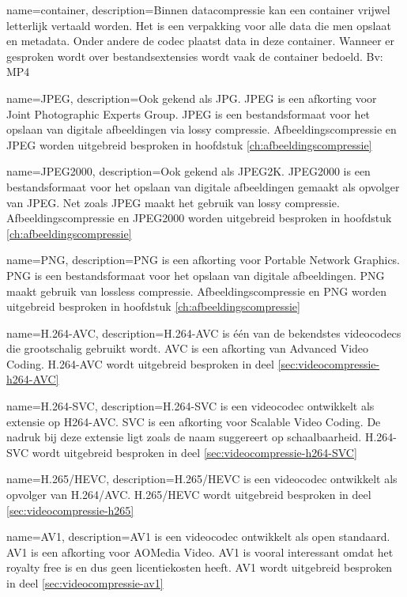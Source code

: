 {
	name={container},
	description={Binnen datacompressie kan een container vrijwel letterlijk vertaald worden. Het is een verpakking voor alle data die men opslaat en metadata. Onder andere de codec plaatst data in deze container. Wanneer er gesproken wordt over bestandsextensies wordt vaak de container bedoeld. Bv: MP4}
}

{
	name={JPEG},
	description={Ook gekend als JPG. JPEG is een afkorting voor Joint Photographic Experts Group. JPEG is een bestandsformaat voor het opslaan van digitale afbeeldingen via lossy compressie. Afbeeldingscompressie en JPEG worden uitgebreid besproken in hoofdstuk \ref{ch:afbeeldingscompressie}}
}

{
	name={JPEG2000},
	description={Ook gekend als JPEG2K. JPEG2000 is een bestandsformaat voor het opslaan van digitale afbeeldingen gemaakt als opvolger van JPEG. Net zoals JPEG maakt het gebruik van lossy compressie. Afbeeldingscompressie en JPEG2000 worden uitgebreid besproken in hoofdstuk \ref{ch:afbeeldingscompressie}}
}

{
	name={PNG},
	description={PNG is een afkorting voor Portable Network Graphics. PNG is een bestandsformaat voor het opslaan van digitale afbeeldingen. PNG maakt gebruik van lossless compressie. Afbeeldingscompressie en PNG worden uitgebreid besproken in hoofdstuk \ref{ch:afbeeldingscompressie}}
}

{
	name={H.264-AVC},
	description={H.264-AVC is één van de bekendstes videocodecs die grootschalig gebruikt wordt. AVC is een afkorting van Advanced Video Coding. H.264-AVC wordt uitgebreid besproken in deel \ref{sec:videocompressie-h264-AVC}}
}

{
	name={H.264-SVC},
	description={H.264-SVC is een videocodec ontwikkelt als extensie op H264-AVC. SVC is een afkorting voor Scalable Video Coding. De nadruk bij deze extensie ligt zoals de naam suggereert op schaalbaarheid. H.264-SVC wordt uitgebreid besproken in deel \ref{sec:videocompressie-h264-SVC}}
}

{
	name={H.265/HEVC},
	description={H.265/HEVC is een videocodec ontwikkelt als opvolger van H.264/AVC. H.265/HEVC wordt uitgebreid besproken in deel \ref{sec:videocompressie-h265}}
}

{
	name={AV1},
	description={AV1 is een videocodec ontwikkelt als open standaard. AV1 is een afkorting voor AOMedia Video. AV1 is vooral interessant omdat het royalty free is en dus geen licentiekosten heeft. AV1  wordt uitgebreid besproken in deel \ref{sec:videocompressie-av1}}
}

